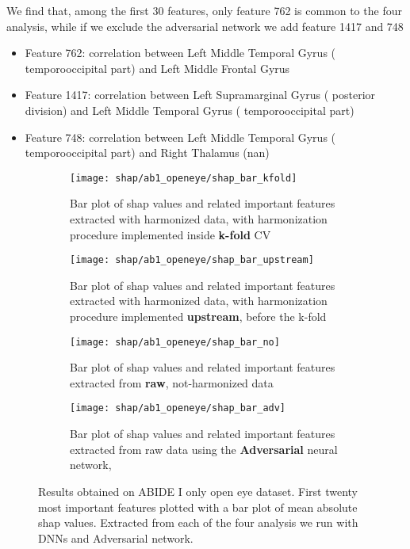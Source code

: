 \documentclass[11pt]{report}
\begin{document}
We find that, among the first 30 features, only feature  762 is common to the four analysis, while if we exclude the adversarial network we add feature 1417 and 748




\begin{itemize}
\item Feature 762: correlation between Left Middle Temporal Gyrus ( temporooccipital part) and Left Middle Frontal Gyrus
\item Feature 1417: correlation between Left Supramarginal Gyrus ( posterior division) and Left Middle Temporal Gyrus ( temporooccipital part)
\item Feature 748: correlation between Left Middle Temporal Gyrus ( temporooccipital part) and Right Thalamus (nan)
\end{itemize}



\begin{figure}[h!]
\centering
\begin{subfigure}[c]{.45\linewidth}
  \texttt{[image: shap/ab1\_openeye/shap\_bar\_kfold]}
   \caption{Bar plot of shap values and related important features extracted with harmonized data, with harmonization procedure implemented inside \textbf{k-fold} CV}
   \label{fig:shap_bar_kfold_}
\end{subfigure}
\begin{subfigure}[c]{.45\textwidth}
   \texttt{[image: shap/ab1\_openeye/shap\_bar\_upstream]}
   \caption{Bar plot of shap values and related important features extracted with harmonized data, with harmonization procedure implemented \textbf{upstream}, before the k-fold}
   \label{}
\end{subfigure}
\hspace{3mm}
\begin{subfigure}[c]{.45\textwidth}
   \texttt{[image: shap/ab1\_openeye/shap\_bar\_no]}
   \caption{Bar plot of shap values and related important features extracted from \textbf{raw}, not-harmonized data}
   \label{}
\end{subfigure}
\begin{subfigure}[c]{.45\textwidth}
   \texttt{[image: shap/ab1\_openeye/shap\_bar\_adv]}
   \caption{Bar plot of shap values and related important features extracted from raw data using the \textbf{Adversarial} neural network,}
   \label{}
\end{subfigure}
\caption{Results obtained on ABIDE I only open eye dataset. First twenty most important features plotted with a bar plot of mean absolute shap values. Extracted from each of the four analysis we run with DNNs and Adversarial network. }
\label{fig:shap_abide_all}
\end{figure}
\end{document}
